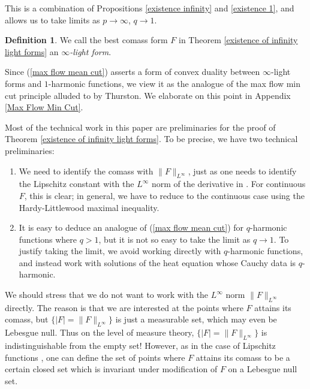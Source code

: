\documentclass[reqno,11pt]{amsart}
\newcommand{\dfn}[1]{\emph{#1}\index{#1}}
\theoremstyle{definition}
\newtheorem{definition}[theorem]{Definition}
\numberwithin{equation}{section}
\begin{document}
This is a combination of Propositions \ref{existence infinity} and \ref{existence 1}, and allows us to take limits as $p \to \infty$, $q \to 1$.

\begin{definition}
We call the best comass form $F$ in Theorem \ref{existence of infinity light forms} an \dfn{$\infty$-light form}.
\end{definition}

Since (\ref{max flow mean cut}) asserts a form of convex duality between $\infty$-light forms and $1$-harmonic functions, we view it as the analogue of the max flow min cut principle alluded to by Thurston.
We elaborate on this point in Appendix \ref{Max Flow Min Cut}.

Most of the technical work in this paper are preliminaries for the proof of Theorem \ref{existence of infinity light forms}.
To be precise, we have two technical preliminaries:
\begin{enumerate}
\item We need to identify the comass with $\|F\|_{L^\infty}$, just as one needs to identify the Lipschitz constant with the $L^\infty$ norm of the derivative in \cite{Crandall2008,daskalopoulos2020transverse}. For continuous $F$, this is clear; in general, we have to reduce to the continuous case using the Hardy-Littlewood maximal inequality.
\item It is easy to deduce an analogue of (\ref{max flow mean cut}) for $q$-harmonic functions where $q > 1$, but it is not so easy to take the limit as $q \to 1$. To justify taking the limit, we avoid working directly with $q$-harmonic functions, and instead work with solutions of the heat equation whose Cauchy data is $q$-harmonic.
\end{enumerate}
We should stress that we do not want to work with the $L^\infty$ norm $\|F\|_{L^\infty}$ directly.
The reason is that we are interested at the points where $F$ attains its comass, but $\{|F| = \|F\|_{L^\infty}\}$ is just a measurable set, which may even be Lebesgue null.
Thus on the level of measure theory, $\{|F| = \|F\|_{L^\infty}\}$ is indistinguishable from the empty set!
However, as in the case of Lipschitz functions \cite{Crandall2008,daskalopoulos2020transverse}, one can define the set of points where $F$ attains its comass to be a certain closed set which is invariant under modification of $F$ on a Lebesgue null set.

\end{document}
